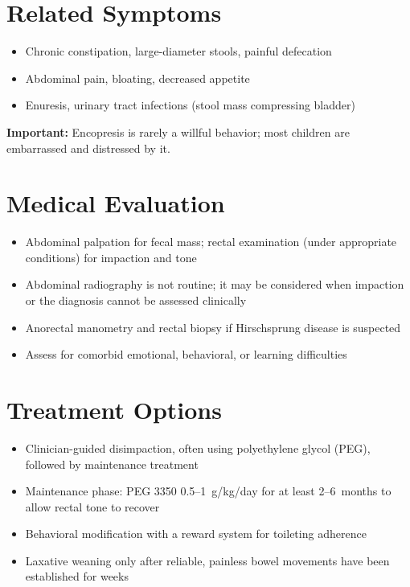 \section*{Related Symptoms}
\begin{itemize}
  \item Chronic constipation, large-diameter stools, painful defecation
  \item Abdominal pain, bloating, decreased appetite
  \item Enuresis, urinary tract infections (stool mass compressing bladder)
\end{itemize}
\textbf{Important:} Encopresis is rarely a willful behavior; most children are embarrassed and distressed by it.

\section*{Medical Evaluation}
\begin{itemize}
  \item Abdominal palpation for fecal mass; rectal examination (under appropriate conditions) for impaction and tone
  \item Abdominal radiography is not routine; it may be considered when impaction or the diagnosis cannot be assessed clinically
  \item Anorectal manometry and rectal biopsy if Hirschsprung disease is suspected
  \item Assess for comorbid emotional, behavioral, or learning difficulties
\end{itemize}

\section*{Treatment Options}
\begin{itemize}
  \item Clinician-guided disimpaction, often using polyethylene glycol (PEG), followed by maintenance treatment
  \item Maintenance phase: PEG 3350 0.5--1~g/kg/day for at least 2--6~months to allow rectal tone to recover
  \item Behavioral modification with a reward system for toileting adherence
  \item Laxative weaning only after reliable, painless bowel movements have been established for weeks
\end{itemize}

